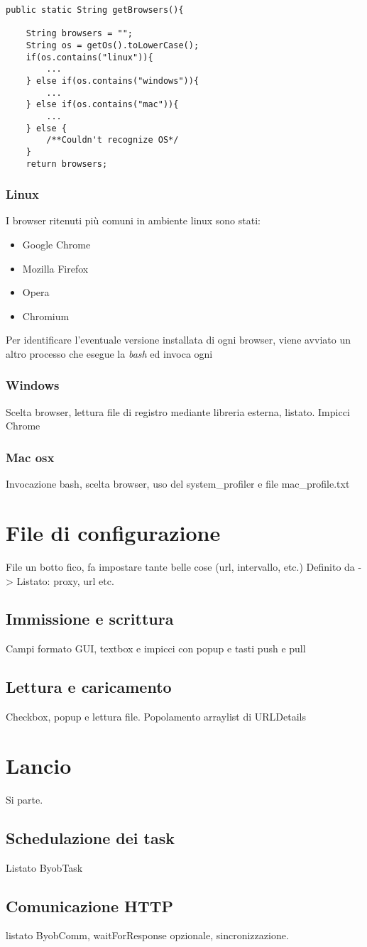 \vspace{0.5cm}
\begin{lstlisting}
public static String getBrowsers(){

	String browsers = "";
	String os = getOs().toLowerCase();
	if(os.contains("linux")){
		...
	} else if(os.contains("windows")){
		...
	} else if(os.contains("mac")){
		...
	} else {
		/**Couldn't recognize OS*/
	}
	return browsers;
\end{lstlisting}

\subsubsection{Linux}
I browser ritenuti pi\`{u} comuni in ambiente linux sono stati:
\begin{itemize}
	\item Google Chrome
	\item Mozilla Firefox
	\item Opera
	\item Chromium
\end{itemize}
Per identificare l'eventuale versione installata di ogni browser, viene avviato un altro processo che esegue la \textit{bash} ed invoca ogni 

\subsubsection{Windows}
Scelta browser, lettura file di registro mediante libreria esterna, listato.
Impicci Chrome

\subsubsection{Mac osx}
Invocazione bash, scelta browser, uso del system\_profiler e file mac\_profile.txt

\section{File di configurazione}
File un botto fico, fa impostare tante belle cose (url, intervallo, etc.) Definito da -> Listato: proxy, url etc.

\subsection{Immissione e scrittura}
Campi formato GUI, textbox e impicci con popup e tasti push e pull

\subsection{Lettura e caricamento}
Checkbox, popup e lettura file.
Popolamento arraylist di URLDetails

\section{Lancio}
Si parte.

\subsection{Schedulazione dei task}
Listato ByobTask

\subsection{Comunicazione HTTP}
listato ByobComm, waitForResponse opzionale, sincronizzazione.



